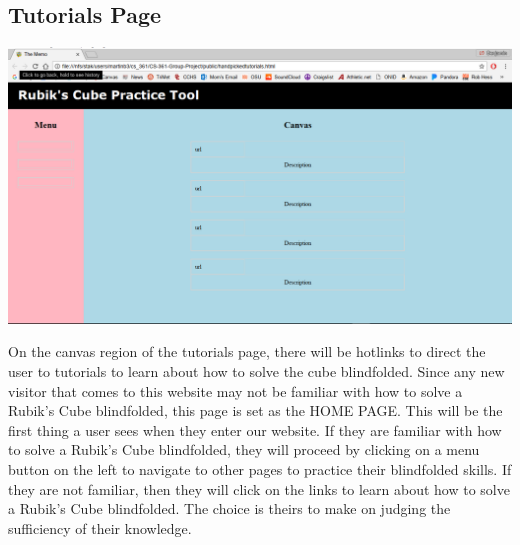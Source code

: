\documentclass[12pt]{article}
\begin{document}
	\subsection{Tutorials Page}
	\includegraphics[width = \textwidth]{tutorial.PNG}
	\par
	On the canvas region of the tutorials page, there will be hotlinks to direct the user to tutorials to learn about how to solve the cube blindfolded. Since any new visitor that comes to this website may not be familiar with how to solve a Rubik's Cube blindfolded, this page is set as the HOME PAGE. This will be the first thing a user sees when they enter our website. If they are familiar with how to solve a Rubik's Cube blindfolded, they will proceed by clicking on a menu button on the left to navigate to other pages to practice their blindfolded skills. If they are not familiar, then they will click on the links to learn about how to solve a Rubik's Cube blindfolded. The choice is theirs to make on judging the sufficiency of their knowledge. \\
	
\end{document}
